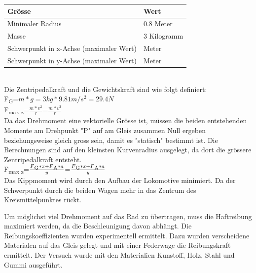 \documentclass[../../main.tex]{subfiles}
\begin{document}
\begin{table}[H]
\begin{table}[H]
\begin{table}[H]
\begin{table}[H]
    \begin{table}[H] \centering
        \begin{tabular}{|l|l|}
        \hline
        \textbf{Grösse} & \textbf{Wert}\\
        \hline
        Minimaler Radius                                 & 0.8 Meter\\
         \hline
        Masse                                            & 3 Kilogramm\\
        \hline
        Schwerpunkt in x-Achse (maximaler Wert)          & Meter\\
        \hline
        Schwerpunkt in y-Achse (maximaler Wert)          & Meter\\
        \hline
        \end{tabular}\\
   
        Die Zentripedalkraft und die Gewichtskraft sind wie folgt definiert:\\
    
    F\textsubscript{G}=\(m*g=3kg*9.81m/s^2=29.4N\)\\

    F\textsubscript{max z}=\(\frac{m*v^2}{r}\)=\(\frac{m*v^2}{r}\)\\
    
    Da das Drehmoment eine vektorielle Grösse ist, müssen die beiden entstehenden Momente am Drehpunkt "P" auf am Gleis zusammen Null ergeben beziehungsweise gleich gross sein, damit es "statisch" bestimmt ist. Die Berechnungen sind auf den kleinsten Kurvenradius ausgelegt, da dort die grössere Zentripedalkraft entsteht.\\

    F\textsubscript{max z}=\(\frac{F\textsubscript{G}*x+F\textsubscript{A}*a}{y}\)=\(\frac{F\textsubscript{G}*x+F\textsubscript{A}*a}{y}\)\\

    
    Das Kippmoment wird durch den Aufbau der Lokomotive minimiert. Da der Schwerpunkt durch die beiden Wagen mehr in das Zentrum des Kreismittelpunktes rückt.
    
    Um möglichst viel Drehmoment auf das Rad zu übertragen, muss die Haftreibung maximiert werden, da die Beschleunigung davon abhängt. Die Reibungskoeffizienten wurden experimentell ermittelt. Dazu wurden verscheidene Materialen auf das Gleis gelegt und mit einer Federwage die Reibungskraft ermittelt. Der Versuch wurde mit den Materialien Kunstoff, Holz, Stahl und Gummi ausgeführt.


\end{table}
\end{table}
\end{table}
\end{table}
\end{table}
\end{document}

